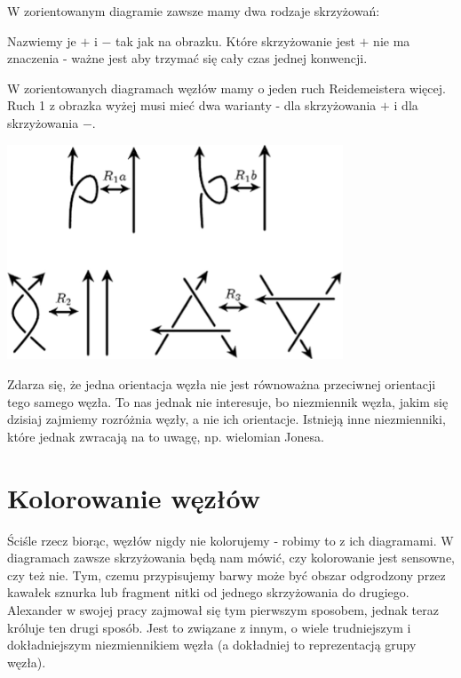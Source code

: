 \documentclass{article}
\begin{document}
W zorientowanym diagramie zawsze mamy dwa rodzaje skrzyżowań:
\begin{center}
\end{center}
Nazwiemy je $+$ i $-$ tak jak na obrazku. Które skrzyżowanie jest $+$ nie ma znaczenia - ważne jest aby trzymać się cały czas jednej konwencji.

W zorientowanych diagramach węzłów mamy o jeden ruch Reidemeistera więcej. Ruch 1 z obrazka wyżej musi mieć dwa warianty - dla skrzyżowania $+$ i dla skrzyżowania $-$.

\begin{center}
  \includegraphics[width=10cm]{oriented_reidemeister.png}
\end{center}

Zdarza się, że jedna orientacja węzła nie jest równoważna przeciwnej orientacji tego samego węzła. To nas jednak nie interesuje, bo niezmiennik węzła, jakim się dzisiaj zajmiemy rozróżnia węzły, a nie ich orientacje. Istnieją inne niezmienniki, które jednak zwracają na to uwagę, np. wielomian Jonesa.

\section{Kolorowanie węzłów}

Ściśle rzecz biorąc, węzłów nigdy nie kolorujemy - robimy to z ich diagramami. W diagramach zawsze skrzyżowania będą nam mówić, czy kolorowanie jest sensowne, czy też nie. Tym, czemu przypisujemy barwy może być obszar odgrodzony przez kawałek sznurka lub fragment nitki od jednego skrzyżowania do drugiego. Alexander w swojej pracy zajmował się tym pierwszym sposobem, jednak teraz króluje ten drugi sposób. Jest to związane z innym, o wiele trudniejszym i dokładniejszym niezmiennikiem węzła (a dokładniej to reprezentacją grupy węzła).
\end{document}
